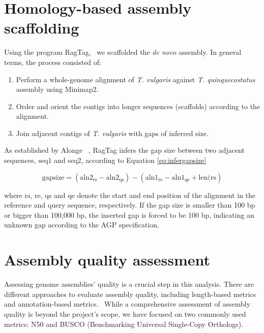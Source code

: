 \section*{Homology-based assembly scaffolding}\label{sec:scaffold}

Using the program RagTag,~\cite{alongeAutomatedAssemblyScaffolding2022} we scaffolded the \textit{de novo} assembly. In general terms, the process consisted of: 
\begin{enumerate}
    \item Perform a whole-genome alignment of \textit{T. vulgaris} against \textit{T. quinquecostatus} assembly using Minimap2. 
    \item Order and orient the contigs into longer sequences (scaffolds) according to the alignment. 
    \item Join adjacent contigs of \textit{T. vulgaris} with gaps of inferred size. 
\end{enumerate}

As established by Alonge \etal~\cite{alongeAutomatedAssemblyScaffolding2022}, RagTag infers the gap size between two adjacent sequences, $\textrm{seq1}$ and \textrm{seq2}, according to Equation \eqref{eq:infergapsize}

\begin{equation}\label{eq:infergapsize}
\textrm{gapsize}  = \left(\textrm{aln2}_\textrm{rs} - \textrm{aln2}_\textrm{qs}\right) - \left(\textrm{aln1}_\textrm{re} - \textrm{aln1}_\textrm{qe} + \textrm{len}(\textrm{rs}\right)
\end{equation}

where $\textrm{rs}$, $\textrm{re}$, $\textrm{qs}$ and $\textrm{qe}$ denote the start and end position of the alignment in the reference and query sequence, respectively. If the gap size is smaller than 100 bp or bigger than 100,000 bp, the inserted gap is forced to be 100 bp, indicating an unknown gap according to the AGP specification.~\cite{AGPSpecificationV2} 

\section*{Assembly quality assessment}

Assessing genome assemblies' quality is a crucial step in this analysis. There are different approaches to evaluate assembly quality, including length-based metrics and annotation-based metrics.~\cite{mokhtarLargescaleAssessmentQuality2023} While a comprehensive assessment of assembly quality is beyond the project's scope, we have focused on two commonly used metrics: N50 and BUSCO (Benchmarking Universal Single-Copy Orthologs).~\cite{manniBUSCOAssessingGenomic2021} \\

